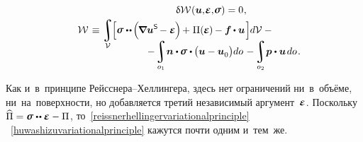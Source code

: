 \begin{otherlanguage}{russian}
\nopagebreak\vspace{-0.2em}\begin{multline}\label{huwashizuvariationalprinciple}
\hfil \variation{\mathcal{W}} \hspace{.1ex} (\bm{u}, \hspace{-0.32ex}\infinitesimaldeformation, \hspace{-0.32ex}\linearstress) = 0
\hspace{.1ex} ,
\\[-0.1em]
%
\shoveleft{\displaystyle \mathcal{W} \hspace{.2ex} \equiv
\displaystyle\integral\displaylimits_{\mathcal{V}} \hspace{-0.3ex}
\Bigl[
\linearstress \dotdotp \hspace{-0.2ex} \Bigl( \hspace{-0.2ex} \boldnabla {\bm{u}}^{\mathsf{S}} \hspace{-0.2ex} - \infinitesimaldeformation \hspace{-0.1ex} \Bigr) \hspace{-0.2ex} + \hspace{.1ex} \potential(\hspace{-0.1ex}\infinitesimaldeformation\hspace{-0.1ex})\hspace{-0.1ex} -
\bm{f} \hspace{-0.1ex} \dotp \bm{u}
\hspace{.2ex} \Bigr] \hspace{-0.1ex} d\mathcal{V} \hspace{.5ex}
- \hfill}
\\[-1.2em]
%
\hspace{8em}
- \hspace{-0.2ex} \displaystyle\integral\displaylimits_{o_1} \hspace{-0.4ex} \unitnormalvector \dotp \hspace{-0.1ex} \linearstress \dotp \hspace{-0.1ex} \bigl( \bm{u} - \bm{u}_{\raisemath{-0.1em}{0}} \bigr) do \hspace{.2ex}
- \hspace{-0.2ex} \integral\displaylimits_{o_2} \hspace{-0.4ex} \bm{p} \dotp \bm{u} \hspace{.25ex} do
\hspace{.2ex} .
\end{multline}

Как и~в~принципе Рейсснера\hbox{--}Хеллингера, здесь нет ограничений ни~в~объёме, ни~на~поверхности, но добавляется третий независимый аргумент~$\infinitesimaldeformation$.
Поскольку ${\widehat{\potential} = \linearstress \dotdotp \infinitesimaldeformation - \potential}$, то~\eqref{reissnerhellingervariationalprinciple} ~\eqref{huwashizuvariationalprinciple} кажутся почти одним и~тем~же.


\end{otherlanguage}
